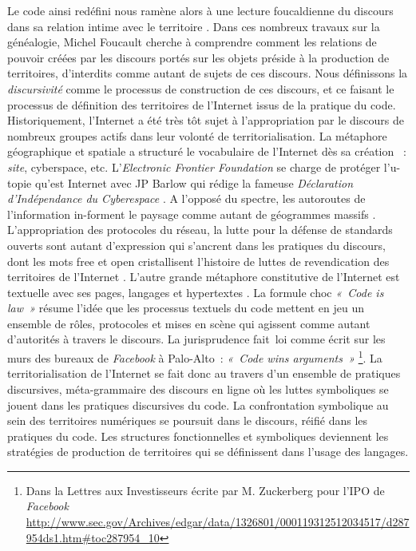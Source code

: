 Le code ainsi redéfini nous ramène alors à une lecture foucaldienne du discours dans sa relation intime avec le territoire \citep{Foucault2004}. Dans ces nombreux travaux sur la généalogie, Michel Foucault cherche à comprendre comment les relations de pouvoir créées par les discours portés sur les objets préside à la production de territoires, d’interdits comme autant de sujets de ces discours. Nous définissons la \textit{discursivité} comme le processus de construction de ces discours, et ce faisant le processus de définition des territoires de l’Internet issus de la pratique du code. Historiquement, l’Internet a été très tôt sujet à l’appropriation par le discours de nombreux groupes actifs dans leur volonté de territorialisation. La métaphore géographique et spatiale a structuré le vocabulaire de l’Internet dès sa création \citep{Graham1998} : \textit{site}, cyberspace, etc. L’\textit{Electronic Frontier Foundation} se charge de protéger l’u-topie qu’est Internet avec JP Barlow qui rédige la fameuse \textit{Déclaration d’Indépendance du Cyberespace} \citep{Barlow2001}. A l’opposé du spectre, les autoroutes de l’information in-forment le paysage comme autant de géogrammes massifs \citep{Berque1999}. L’appropriation des protocoles du réseau, la lutte pour la défense de standards ouverts sont autant d’expression qui s’ancrent dans les pratiques du discours, dont les mots free et open cristallisent l’histoire de luttes de revendication des territoires de l’Internet \citep{Blondeau2000}. L’autre grande métaphore constitutive de l’Internet est textuelle avec ses pages, langages et hypertextes \citep{Vandendorpe1999}. La formule choc \textit{« Code is law »} \citep{Lessig2006} résume l’idée  que les processus textuels du code mettent en jeu un ensemble de rôles, protocoles et mises en scène qui agissent comme autant d’autorités à travers le discours. La jurisprudence fait loi comme écrit sur les murs des bureaux de \textit{Facebook} à Palo-Alto : \textit{« Code wins arguments »} \footnote{Dans la Lettres aux Investisseurs écrite par M. Zuckerberg  pour l’IPO de \textit{Facebook} \url{http://www.sec.gov/Archives/edgar/data/1326801/000119312512034517/d287954ds1.htm\#toc287954_10}}. La territorialisation de l’Internet se fait donc au travers d’un ensemble de pratiques discursives, méta-grammaire des discours en ligne où les luttes symboliques se jouent dans les pratiques discursives du code. La confrontation symbolique au sein des territoires numériques se poursuit dans le discours, réifié dans les pratiques du code. Les structures fonctionnelles et symboliques deviennent les stratégies de production de territoires qui se définissent dans l’usage des langages. 

